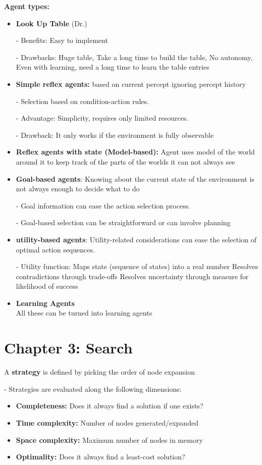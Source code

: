 \documentclass{../cheat}
\begin{document}
\begin{multicols}{3}
	\textbf{Agent types:}
	\begin{itemize}
		\item \textbf{Look Up Table} (Dr.)
			\item [-] Benefits: Easy to implement 
			\item [-] Drawbacks: Huge table, Take a long time to build the table, No autonomy, Even with learning, need a long time to learn the table entries
		\item\textbf{Simple reflex agents:} based on current percept ignoring percept history
			\item [-] Selection based on condition-action rules.
			\item [-] Advantage: Simplicity, requires only limited resources.
			\item [-] Drawback: It only works if the environment is fully observable
		\item \textbf{Reflex agents with state (Model-based):} Agent uses model of the world around it to keep track of the parts of the worlds it can not always see
		\item \textbf{Goal-based agents}: Knowing about the current state of the environment is not always enough to decide what to do
			\item [-] Goal information can ease the action selection process.
			\item [-] Goal-based selection can be straightforward or can involve planning
		\item \textbf{utility-based agents}: Utility-related considerations can ease the selection of optimal action sequences.
			\item [-] Utility function: 
				\checkmark Maps state (sequence of states) into a real number
				\checkmark Resolves contradictions through trade-offs
				\checkmark Resolves uncertainty through measure for likelihood of success
		\item \textbf{Learning Agents}\\
		All these can be turned into learning agents
	\end{itemize}


	\section{Chapter 3: Search}
	A \textbf{strategy} is defined by picking the order of node expansion
	
	- Strategies are evaluated along the following dimensions:
	\begin{itemize}
		\item \textbf{Completeness:} Does it always find a solution if one exists?
		\item \textbf{Time complexity:} Number of nodes generated/expanded
		\item \textbf{Space complexity:} Maximum number of nodes in memory
		\item \textbf{Optimality:} Does it always find a least-cost solution?
	\end{itemize}
	

\end{multicols}
\end{document}
